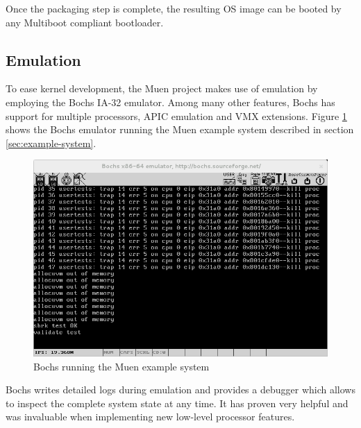 Once the packaging step is complete, the resulting OS image can be booted by any
Multiboot \cite{multiboot} compliant bootloader.

\subsection{Emulation}\label{subsec:emulation}
To ease kernel development, the Muen project makes use of emulation by employing
the Bochs IA-32 emulator. Among many other features, Bochs has support for
multiple processors, APIC emulation and VMX extensions. Figure \ref{fig:bochs}
shows the Bochs emulator running the Muen example system described in section
\ref{sec:example-system}.

\begin{figure}[h]
	\centering
	\includegraphics[width=\textwidth]{images/bochs}
	\caption{Bochs running the Muen example system}
	\label{fig:bochs}
\end{figure}

Bochs writes detailed logs during emulation and provides a debugger which allows
to inspect the complete system state at any time. It has proven very helpful
and was invaluable when implementing new low-level processor features.
